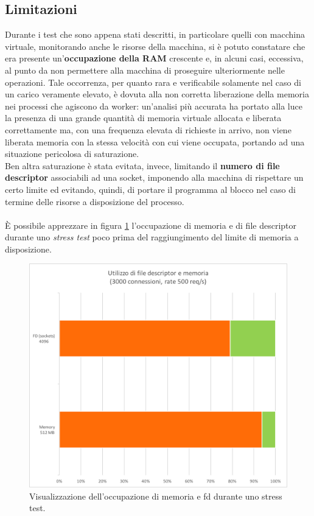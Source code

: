 \documentclass[italian]{tktltiki2}
\begin{document}
\subsection{Limitazioni}
Durante i test che sono appena stati descritti, in particolare quelli con macchina virtuale, monitorando anche le risorse della macchina, si è potuto constatare che era presente un'\textbf{occupazione della RAM} crescente e, in alcuni casi, eccessiva, al punto da non permettere alla macchina di proseguire ulteriormente nelle operazioni. Tale occorrenza, per quanto rara e verificabile solamente nel caso di un carico veramente elevato, è dovuta alla non corretta liberazione della memoria nei processi che agiscono da worker: un'analisi più accurata ha portato alla luce la presenza di una grande quantità di memoria virtuale allocata e liberata correttamente ma, con una frequenza elevata di richieste in arrivo, non viene liberata memoria con la stessa velocità con cui viene occupata, portando ad una situazione pericolosa di saturazione. \\
Ben altra saturazione è stata evitata, invece, limitando il \textbf{numero di file descriptor} associabili ad una socket, imponendo alla macchina di rispettare un certo limite ed evitando, quindi, di portare il programma al blocco nel caso di termine delle risorse a disposizione del processo. \\\\
È possibile apprezzare in figura \ref{fig: fd_memory} l'occupazione di memoria e di file descriptor durante uno \emph{stress test} poco prima del raggiungimento del limite di memoria a disposizione. 
\begin{figure}[H]
\centering
\includegraphics[width=\textwidth]{images/fd_memory}
\caption{Visualizzazione dell'occupazione di memoria e fd durante uno stress test.\label{fig: fd_memory}}
\end{figure}
\end{document}
